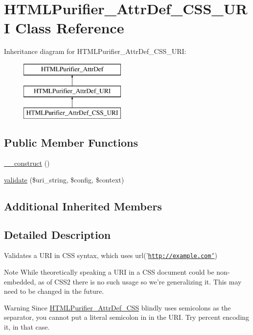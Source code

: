 \hypertarget{classHTMLPurifier__AttrDef__CSS__URI}{\section{H\+T\+M\+L\+Purifier\+\_\+\+Attr\+Def\+\_\+\+C\+S\+S\+\_\+\+U\+R\+I Class Reference}
\label{classHTMLPurifier__AttrDef__CSS__URI}
}
Inheritance diagram for H\+T\+M\+L\+Purifier\+\_\+\+Attr\+Def\+\_\+\+C\+S\+S\+\_\+\+U\+R\+I\+:\begin{figure}[H]
\begin{center}
\leavevmode
\includegraphics[height=3.000000cm]{classHTMLPurifier__AttrDef__CSS__URI}
\end{center}
\end{figure}
\subsection*{Public Member Functions}
\begin{DoxyCompactItemize}
\item 
\hyperlink{classHTMLPurifier__AttrDef__CSS__URI_a34910ed8f63ad35872ed37754d29317b}{\+\_\+\+\_\+construct} ()
\item 
\hyperlink{classHTMLPurifier__AttrDef__CSS__URI_ad04ca62bfb7bf5d281cec47c597cf200}{validate} (\$uri\+\_\+string, \$config, \$context)
\end{DoxyCompactItemize}
\subsection*{Additional Inherited Members}


\subsection{Detailed Description}
Validates a U\+R\+I in C\+S\+S syntax, which uses url('\href{http://example.com'}{\tt http\+://example.\+com'}) \begin{DoxyNote}{Note}
While theoretically speaking a U\+R\+I in a C\+S\+S document could be non-\/embedded, as of C\+S\+S2 there is no such usage so we're generalizing it. This may need to be changed in the future. 
\end{DoxyNote}
\begin{DoxyWarning}{Warning}
Since \hyperlink{classHTMLPurifier__AttrDef__CSS}{H\+T\+M\+L\+Purifier\+\_\+\+Attr\+Def\+\_\+\+C\+S\+S} blindly uses semicolons as the separator, you cannot put a literal semicolon in in the U\+R\+I. Try percent encoding it, in that case. 
\end{DoxyWarning}


